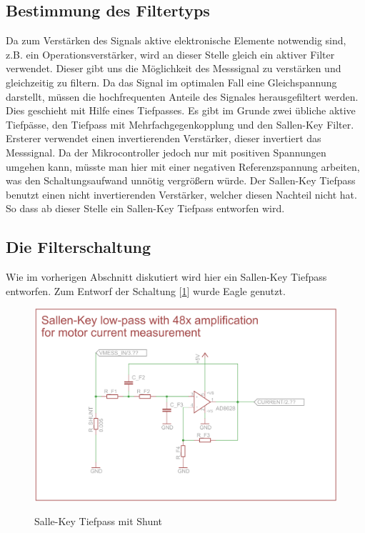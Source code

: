 \subsection{Bestimmung des Filtertyps}
Da zum Verstärken des Signals aktive elektronische Elemente notwendig sind, z.B. ein Operationsverstärker, wird an dieser Stelle gleich ein aktiver Filter verwendet. 
Dieser gibt uns die Möglichkeit des Messsignal zu verstärken und gleichzeitig zu
filtern. Da das Signal im optimalen Fall eine Gleichspannung darstellt, müssen die hochfrequenten Anteile des Signales herausgefiltert werden. Dies geschieht 
mit Hilfe eines Tiefpasses. Es gibt im Grunde zwei übliche aktive Tiefpässe, den Tiefpass mit Mehrfachgegenkopplung und den Sallen-Key Filter. Ersterer verwendet
einen invertierenden Verstärker, dieser invertiert das Messsignal. Da der Mikrocontroller jedoch nur mit positiven Spannungen umgehen kann, müsste man hier mit einer 
negativen Referenzspannung arbeiten, was den Schaltungsaufwand unnötig vergrößern würde. Der Sallen-Key Tiefpass benutzt einen nicht invertierenden Verstärker, welcher diesen
Nachteil nicht hat. So dass ab dieser Stelle ein Sallen-Key Tiefpass entworfen wird.


\subsection{Die Filterschaltung}

Wie im vorherigen Abschnitt diskutiert wird hier ein Sallen-Key Tiefpass entworfen. Zum Entworf der Schaltung [\ref{fig:fschalt}] wurde Eagle genutzt.

\begin{figure}[H]
\centering
\includegraphics[width=.8\textwidth]{filter_schaltung.png}\\
\caption{Salle-Key Tiefpass mit Shunt}%
\label{fig:fschalt}
\end{figure}



